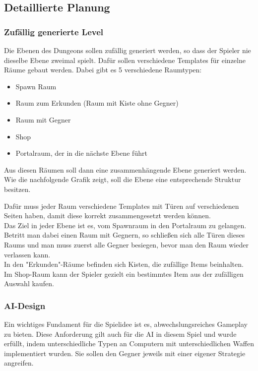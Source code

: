 \subsection{Detaillierte Planung}
\subsubsection{Zufällig generierte Level}
Die Ebenen des Dungeons sollen zufällig generiert werden, so dass der Spieler nie dieselbe Ebene zweimal spielt. Dafür sollen verschiedene Templates für einzelne Räume gebaut werden. Dabei gibt es 5 verschiedene Raumtypen:
\begin{itemize}
\item Spawn Raum
\item Raum zum Erkunden (Raum mit Kiste ohne Gegner)
\item Raum mit Gegner
\item Shop
\item Portalraum, der in die nächste Ebene führt
\end{itemize}
Aus diesen Räumen soll dann eine zusammenhängende Ebene generiert werden. Wie die nachfolgende Grafik zeigt, soll die Ebene eine entsprechende Struktur besitzen.


Dafür muss jeder Raum verschiedene Templates mit Türen auf verschiedenen Seiten haben, damit diese korrekt zusammengesetzt werden können.\\
Das Ziel in jeder Ebene ist es, vom Spawnraum in den Portalraum zu gelangen. Betritt man dabei einen Raum mit Gegnern, so schließen sich alle Türen dieses Raums und man muss zuerst alle Gegner besiegen, bevor man den Raum wieder verlassen kann. \\
In den "Erkunden"-Räume befinden sich Kisten, die zufällige Items beinhalten. Im Shop-Raum kann der Spieler gezielt ein bestimmtes Item aus der zufälligen Auswahl kaufen.

\subsubsection{AI-Design}

Ein wichtiges Fundament für die Spielidee ist es, abwechslungsreiches Gameplay zu bieten. Diese Anforderung gilt auch für die AI in diesem Spiel und wurde erfüllt, indem unterschiedliche Typen an Computern mit unterschiedlichen Waffen implementiert wurden. Sie sollen den Gegner jeweils mit einer eigener Strategie angreifen.

